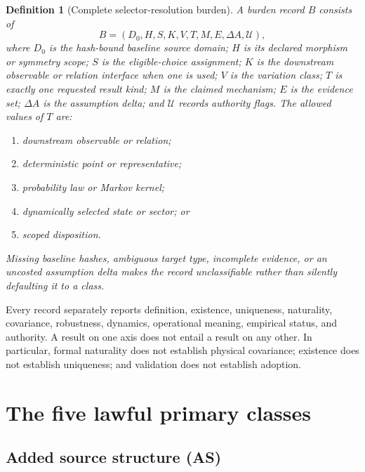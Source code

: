 \documentclass[11pt]{article}
\newtheorem{definition}[proposition]{Definition}
\begin{document}
\begin{definition}[Complete selector-resolution burden]
A burden record $B$ consists of
\[
 B=(D_0,H,S,K,V,T,M,E,\Delta A,\mathcal U),
\]
where $D_0$ is the hash-bound baseline source domain; $H$ is its declared
morphism or symmetry scope; $S$ is the eligible-choice assignment; $K$ is the
downstream observable or relation interface when one is used; $V$ is the
variation class; $T$ is exactly one requested result kind; $M$ is the claimed
mechanism; $E$ is the evidence set; $\Delta A$ is the assumption delta; and
$\mathcal U$ records authority flags.  The allowed values of $T$ are:
\begin{enumerate}[label=(\roman*)]
  \item downstream observable or relation;
  \item deterministic point or representative;
  \item probability law or Markov kernel;
  \item dynamically selected state or sector; or
  \item scoped disposition.
\end{enumerate}
Missing baseline hashes, ambiguous target type, incomplete evidence, or an
uncosted assumption delta makes the record unclassifiable rather than
silently defaulting it to a class.
\end{definition}

Every record separately reports definition, existence, uniqueness,
naturality, covariance, robustness, dynamics, operational meaning, empirical
status, and authority.  A result on one axis does not entail a result on any
other.  In particular, formal naturality does not establish physical
covariance; existence does not establish uniqueness; and validation does not
establish adoption.

\section{The five lawful primary classes}

\subsection{Added source structure (AS)}
\end{document}
